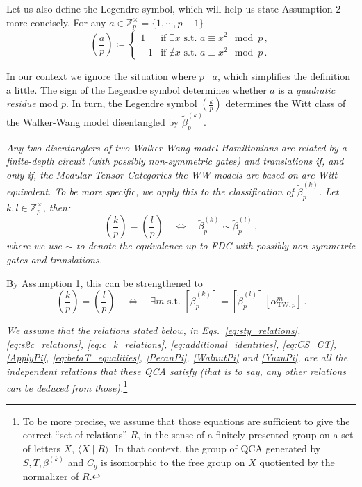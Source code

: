\documentclass[aps,twocolumn,prx,floatfix,preprintnumbers, nofootinbib,10pt]{revtex4-2}
\numberwithin{equation}{section}
\theoremstyle{definition}
\theoremstyle{remark}
\theoremstyle{claim}
\newcommand{\be}{\begin{equation}}
\newcommand{\ee}{\end{equation}}
\newcommand{\Z}{{\mathbb Z}}
\newcommand{\paren}[1]{\left( #1 \right)}
\begin{document}
Let us also define the Legendre symbol, which will help us state Assumption 2 more concisely. For any $a \in \Z_p^\times = \{1, \cdots, p - 1 \}$
\be
\paren{\frac{a}{p}} \coloneqq \begin{cases}
 1 & \text{if } \exists x \text{ s.t. } a \equiv x^2 \mod p \,, \\
 -1 & \text{if } \nexists x \text{ s.t. } a \equiv x^2 \mod p \,.
\end{cases}
\ee

In our context we ignore the situation where $p \mid a$, which simplifies the definition a little. The sign of the Legendre symbol determines whether $a$ is a \emph{quadratic residue} mod $p$. {In turn, the Legendre symbol $\paren{\frac{k}{p}}$ determines the Witt class of the Walker-Wang model disentangled by $\tilde{\beta}_p^{(k)}$.} 

 \textit{Any two disentanglers of {two Walker-Wang model Hamiltonians} are related by a finite-depth circuit (with possibly non-symmetric gates) and translations if, and only if, the Modular Tensor Categories the WW-models are based on are Witt-equivalent. To be more specific, we apply this to the classification of $\tilde{\beta}_p^{(k)}$. Let $k,l \in \Z_p^\times$, then:
\be
\paren{\frac{k}{p}} = \paren{\frac{l}{p}} \quad \iff \quad \tilde{\beta}_p^{(k)} \sim \tilde{\beta}_p^{(l)} \,,
\ee
where we use $\sim$ to denote the equivalence up to FDC with possibly non-symmetric gates and translations.}


By Assumption 1, this can be strengthened to
\be\label{eq:beta_equiv_up_to_T}
\paren{\frac{k}{p}} = \paren{\frac{l}{p}} \quad \iff \quad \exists m \text{ s.t. } [\tilde{\beta}_p^{(k)}] = [\tilde{\beta}_p^{(l)}] [\alpha_{\text{TW}, p}^m] \,.
\ee

 \textit{We assume that the relations stated below, in Eqs.~\eqref{eq:sty_relations}, \eqref{eq:s2c_relations}, \eqref{eq:c_k_relations}, \eqref{eq:additional_identities}, \eqref{eq:CS_CT},
\eqref{ApplyPi}, \eqref{eq:betaT_equalities}, \eqref{PecanPi}, \eqref{WalnutPi} and \eqref{YuzuPi}, are all the independent relations that these QCA satisfy (that is to say, any other relations can be deduced from those).}\footnote{To be more precise, we assume that those equations are sufficient to give the correct ``set of relations'' $R$, in the sense of a finitely presented group on a set of letters $X$, $\langle X \mid R \rangle$. In that context, the group of QCA generated by $S, T, \beta^{(k)}$ and $C_g$ is isomorphic to the free group on $X$ quotiented by the normalizer of $R$.} 
\end{document}

